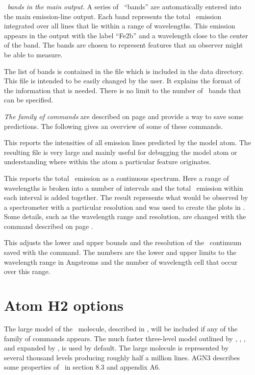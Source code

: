 \emph{\feii\ bands in the main output.}  A series of \feii\ ``bands'' are
automatically entered into the main emission-line output.
Each band represents the total \feii\ emission integrated
over all lines that lie within a range of wavelengths.
This emission appears
in the output with the label ``Fe2b'' and a wavelength close to the center
of the band.
The bands are chosen to represent features that an observer
might be able to measure.

The list of bands is contained in the file
which is included in the data directory.
This file is intended to be easily changed
by the user.
It explains the format of the information that is needed.
There is no limit to the number of \feii\ bands that can be specified.

\emph{The  family of commands}
are described on page \pageref{sec:CommandSaveFeII}
and provide a way to save some predictions.
The following gives an overview of some of these commands.

  This reports the intensities
of all emission
lines predicted by the model atom.
The resulting file is very large and
mainly useful for debugging the model atom or understanding where within
the atom a particular feature originates.

  This reports the
total \feii\ emission as a continuous spectrum.
Here a range of wavelengths is broken into a number
of intervals and the total \feii\ emission within each interval is added
together.
The result represents what would be observed by a spectrometer
with a particular resolution and was used to create the plots
in \citet{Baldwin2004}.
Some details, such as the wavelength range and resolution,
are changed with the  command
described on page \pageref{sec:CommandSetFeIIContinuum}.

This adjusts the lower and upper bounds and the resolution of the
\feii\ continuum
saved with the  command.
The numbers are the lower
and upper limits to the wavelength range in Angstroms and the number of
wavelength cell that occur over this range.

\section{Atom H2 options}

The large model of the \htwo\ molecule, described in \citet{Shaw2005},
will be included if any of the family of 
commands appears.
The much
faster three-level model outlined by \citet{Tielens1985a},
\citet{Burton1990}, \citet{Draine1996},
and expanded
by \citet{Elwert2006}, is used by default.
The large molecule is
represented by several thousand levels producing roughly half a million
lines.
AGN3 describes some properties of \htwo\ in section 8.3
and appendix A6.

